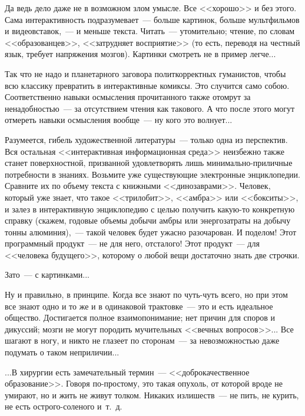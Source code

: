 \documentclass{scrbook}
\newcommand{\flqq}{<<}
\newcommand{\frqq}{>>}
\newcommand{\mdash}{~--- }
\newcommand{\commamdash}{~--- } %
\begin{document}
Да ведь дело даже не в возможном злом умысле. Все {\flqq}хорошо{\frqq} и без этого. Сама интерактивность подразумевает{\mdash}больше картинок, больше мультфильмов и видеовставок,{\commamdash} и меньше текста. Читать{\mdash}утомительно; чтение, по словам {\flqq}образованцев{\frqq}, {\flqq}затрудняет восприятие{\frqq} (то есть, переводя на честный язык, требует напряжения мозгов). Картинки смотреть не в пример легче...

Так что не надо и планетарного заговора политкорректных гуманистов, чтобы всю классику превратить в интерактивные комиксы. Это случится само собою. Соответственно навыки осмысления прочитанного также отомрут за ненадобностью{\mdash}за отсутствием чтения как такового. А что после этого могут отмереть навыки осмысления вообще{\mdash}ну кого это волнует...

Разумеется, гибель художественной литературы{\mdash}только одна из перспектив. Вся остальная {\flqq}интерактивная информационная среда{\frqq} неизбежно также станет поверхностной, призванной удовлетворять лишь минимально-приличные потребности в знаниях. Возьмите уже существующие электронные энциклопедии. Сравните их по объему текста с книжными {\flqq}динозаврами{\frqq}. Человек, который уже знает, что такое {\flqq}трилобит{\frqq}, {\flqq}амбра{\frqq} или {\flqq}бокситы{\frqq}, и залез в интерактивную энциклопедию с целью получить какую-то конкретную справку (скажем, годовые объемы добычи амбры или энергозатраты на добычу тонны алюминия),{\commamdash} такой человек будет ужасно разочарован. И поделом! Этот программный продукт{\mdash}не для него, отсталого! Этот продукт{\mdash}для {\flqq}человека будущего{\frqq}, которому о любой вещи достаточно знать две строчки.

Зато{\mdash}с картинками...

Ну и правильно, в принципе. Когда все знают по чуть-чуть всего, но при этом все знают одно и то же и в одинаковой трактовке{\mdash}это и есть идеальное общество. Достигается полное взаимопонимание; нет причин для споров и дикуссий; мозги не могут породить мучительных {\flqq}вечных вопросов{\frqq}... Все шагают в ногу, и никто не глазеет по сторонам{\mdash}за невозможностью даже подумать о таком неприличии...

...В хирургии есть замечательный термин{\mdash}{\flqq}доброкачественное образование{\frqq}. Говоря по-простому, это такая опухоль, от которой вроде не умирают, но и жить не живут толком. Никаких излишеств{\mdash}не пить, не курить, не есть острого-соленого и~т.~д.
\end{document}
